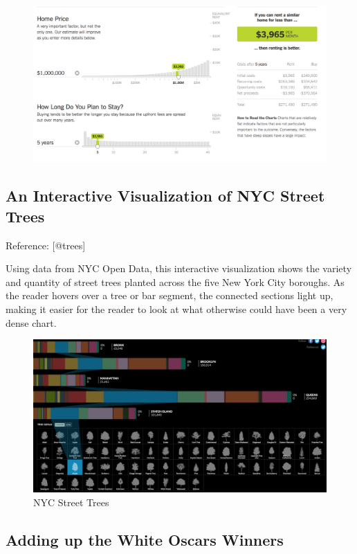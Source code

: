 \documentclass[]{book}
\theoremstyle{definition}
\theoremstyle{definition}
\theoremstyle{definition}
\theoremstyle{remark}
\begin{document}
\begin{figure}
\centering
\includegraphics{images/rentcalc.png}
\caption{}
\end{figure}

\subsection{An Interactive Visualization of NYC Street
Trees}\label{an-interactive-visualization-of-nyc-street-trees}

Reference: {[}@trees{]}

Using data from NYC Open Data, this interactive visualization shows the
variety and quantity of street trees planted across the five New York
City boroughs. As the reader hovers over a tree or bar segment, the
connected sections light up, making it easier for the reader to look at
what otherwise could have been a very dense chart.

\begin{figure}
\centering
\includegraphics{images/NY_trees.png}
\caption{NYC Street Trees}
\end{figure}

\subsection{Adding up the White Oscars
Winners}\label{adding-up-the-white-oscars-winners}
\end{document}

